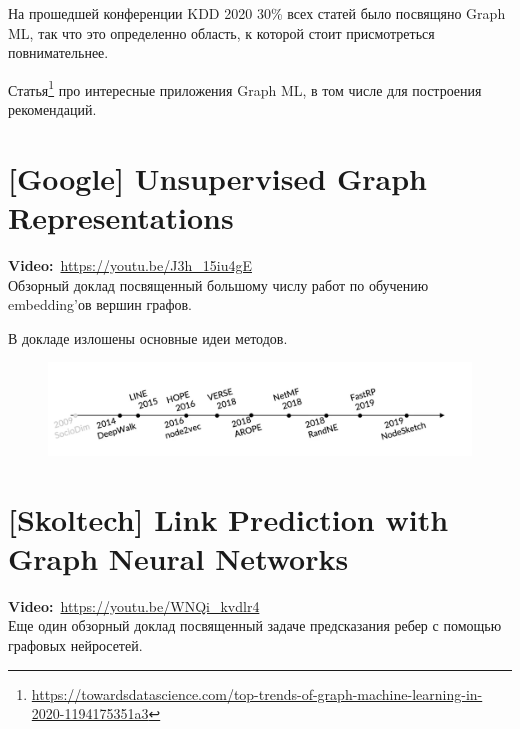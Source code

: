 \begin{remark}
    На прошедшей конференции KDD 2020 30\% всех статей было посвящяно Graph ML, так что это определенно область, к которой стоит присмотреться повнимательнее. 
\end{remark}

Статья\footnote{\url{https://towardsdatascience.com/top-trends-of-graph-machine-learning-in-2020-1194175351a3}} про интересные приложения Graph ML, в том числе для построения рекомендаций.

\section{[Google] Unsupervised Graph Representations}

\textbf{Video:}~\url{https://youtu.be/J3h_15iu4gE} \\

Обзорный доклад посвященный большому числу работ по обучению embedding'ов вершин графов.

В докладе излошены основные идеи методов.

\begin{figure}[ht]
    \centering
    \includegraphics[width=0.9\linewidth]{images/graph_emb.png}
\end{figure}

\section{[Skoltech] Link Prediction with Graph Neural Networks}

\textbf{Video:}~\url{https://youtu.be/WNQi_kvdlr4} \\

Еще один обзорный доклад посвященный задаче предсказания ребер с помощью графовых нейросетей.